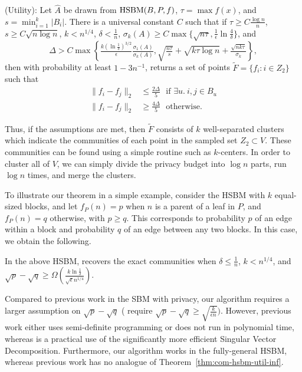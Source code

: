 \begin{thm}\label{thm:com-hsbm-util-inf}
(Utility): 
Let $\hat{A}$ be drawn from $\textnormal{HSBM}(B,P,f)$, $\tau = \max f(x)$, and $s = \min_{i=1}^k |B_i|$. There is a universal constant $C$ such that if $\tau \geq C \frac{\log n}{n}$, $s \geq C \sqrt{n \log n}$, $k < n^{1/4}$, $\delta < \frac{1}{n}$, $\sigma_k(A) \geq C \max\{ \sqrt{n\tau}, \frac{1}{\epsilon} \ln \frac{4}{\delta}\}$, and 
\[\Delta > C\max\left\{\tfrac{ k (\ln \frac{1}{\delta})^{3/2}}\epsilon \tfrac{\sigma_1(A)}{\sigma_{k}(A)},  \sqrt{\tfrac{n\tau}{s}} + \sqrt{k\tau \log n} + \tfrac{\sqrt{nk\tau}}{\sigma_k}\right\},\]
then with probability at least $1 - 3n^{-1}$, \dpcom{} returns a set of points $\tilde{F} = \{f_i : i \in Z_2\}$ such that
\begin{align*}
    \|f_{i} - f_{j}\|_2 &\leq \tfrac{2\Delta}{5}  \ \ \ \text{if $\exists u.~i,j \in B_u$} \\
    \|f_{i} - f_{j}\|_2 &\geq \tfrac{4\Delta}{5}  \ \ \ \text{otherwise}.
\end{align*}
\end{thm}
Thus, if the assumptions are met, then $\tilde{F}$ consists of $k$ well-separated clusters which indicate the communities of each point in the sampled set $Z_2 \subset V$. These communities can be found using a simple routine such as $k$-centers. In order to cluster all of $V$, we can simply divide the privacy budget into $\log n$ parts, run \dpcom{} $\log n$ times, and merge the clusters.

To illustrate our theorem in a simple example, consider the HSBM with $k$ equal-sized blocks, and let $f_P(n) = p$ when $n$ is a parent of a leaf in $P$, and $f_P(n) = q$ otherwise, with $p \geq q$. This corresponds to probability $p$ of an edge within a block and probability $q$ of an edge between any two blocks. In this case, we obtain the following.
\begin{coro}\label{cor:com-hsbm-util}
    In the above HSBM, \dpcom{} recovers the exact communities when $\delta \leq \frac{1}{n}$, $k < n^{1/4}$, and $\sqrt{p} - \sqrt{q} \geq \Omega(\frac{k \ln \frac{1}{\delta}}{\sqrt{\epsilon}n^{1/4}})$.
\end{coro}
Compared to previous work in the SBM with privacy, our algorithm requires a larger assumption on $\sqrt{p} - \sqrt{q}$ (\citet{seif2022differentially,chen2023private} require $\sqrt{p} - \sqrt{q} \geq \sqrt{\frac{k}{\epsilon n}})$. However, previous work either uses semi-definite programming or does not run in polynomial time, whereas \dpcom{} is a practical use of the significantly more efficient Singular Vector Decomposition. Furthermore, our algorithm works in the fully-general HSBM, whereas previous work has no analogue of Theorem~\ref{thm:com-hsbm-util-inf}.

